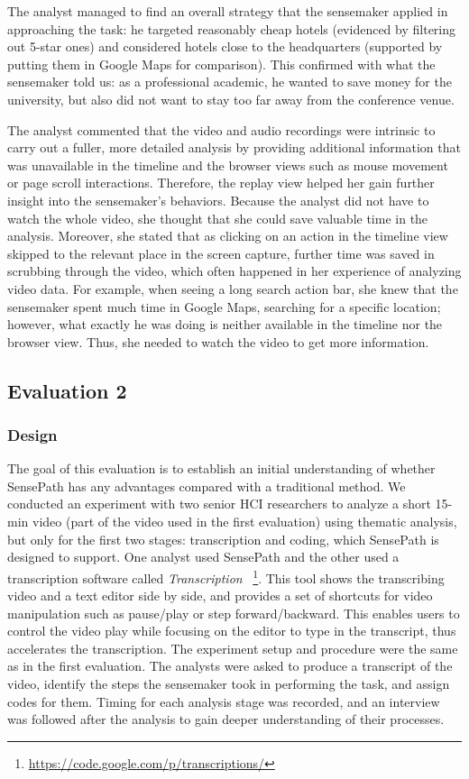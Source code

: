 The analyst managed to find an overall strategy that the sensemaker applied in approaching the task: he targeted reasonably cheap hotels (evidenced by filtering out 5-star ones) and considered hotels close to the headquarters (supported by putting them in Google Maps for comparison). This confirmed with what the sensemaker told us: as a professional academic, he wanted to save money for the university, but also did not want to stay too far away from the conference venue.

The analyst commented that the video and audio recordings were intrinsic to carry out a fuller, more detailed analysis by providing additional information that was unavailable in the timeline and the browser views such as mouse movement or page scroll interactions. Therefore, the replay view helped her gain further insight into the sensemaker's behaviors. Because the analyst did not have to watch the whole video, she thought that she could save valuable time in the analysis. Moreover, she stated that as clicking on an action in the timeline view skipped to the relevant place in the screen capture, further time was saved in scrubbing through the video, which often happened in her experience of analyzing video data. For example, when seeing a long search action bar, she knew that the sensemaker spent much time in Google Maps, searching for a specific location; however, what exactly he was doing is neither available in the timeline nor the browser view. Thus, she needed to watch the video to get more information.

\subsection{Evaluation 2}

\subsubsection{Design}
The goal of this evaluation is to establish an initial understanding of whether SensePath has any advantages compared with a traditional method. We conducted an experiment with two senior HCI researchers to analyze a short 15-min video (part of the video used in the first evaluation) using thematic analysis, but only for the first two stages: transcription and coding, which SensePath is designed to support. One analyst used SensePath and the other used a transcription software called \textit{Transcription} ~\footnote{\url{https://code.google.com/p/transcriptions/}}. This tool shows the transcribing video and a text editor side by side, and provides a set of shortcuts for video manipulation such as pause/play or step forward/backward. This enables users to control the video play while focusing on the editor to type in the transcript, thus accelerates the transcription. The experiment setup and procedure were the same as in the first evaluation. The analysts were asked to produce a transcript of the video, identify the steps the sensemaker took in performing the task, and assign codes for them. Timing for each analysis stage was recorded, and an interview was followed after the analysis to gain deeper understanding of their processes.

